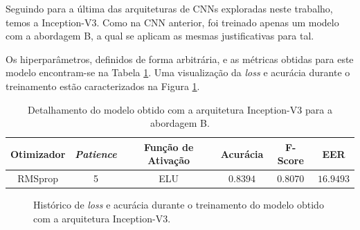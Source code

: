Seguindo para a última das arquiteturas de CNNs exploradas neste trabalho, temos a Inception-V3. Como na CNN anterior, foi treinado apenas um modelo com a abordagem B, a qual se aplicam as mesmas justificativas para tal.

Os hiperparâmetros, definidos de forma arbitrária, e as métricas obtidas para este modelo encontram-se na Tabela \ref{tab:inception}. Uma visualização da \emph{loss} e acurácia durante o treinamento estão caracterizados na Figura \ref{fig:treinamento-inception}.

\begin{table}[h!]
\centering
\caption{Detalhamento do modelo obtido com a arquitetura Inception-V3 para a abordagem B.}
\label{tab:inception}
\begin{tabular}{cccccc}
\toprule
\textbf{Otimizador} & \textbf{\emph{Patience}}  & \textbf{Função de Ativação} & \textbf{Acurácia} & \textbf{F-Score} & \textbf{EER} \\
\midrule
RMSprop & 5 & ELU & $0.8394$ & $0.8070$ & $16.9493$ \\
\bottomrule
\end{tabular}
\end{table}

\begin{figure}[H]
\centering
\caption{Histórico de \emph{loss} e acurácia durante o treinamento do modelo obtido com a arquitetura Inception-V3.}
\label{fig:treinamento-inception}
\hfill
{}
\end{figure}

